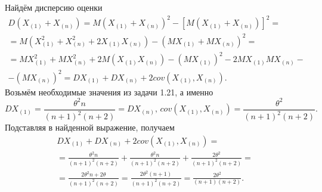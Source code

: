 \begin{enumerate}[label=\alph*)]
  Найдём дисперсию оценки
  \begin{equation*}
    \begin{split}
      D \left( X_{ \left( 1 \right) } + X_{ \left( n \right) } \right) =
      M \left( X_{ \left( 1 \right) } + X_{ \left( n \right) } \right)^2 -
      \left[ M \left(  X_{ \left( 1 \right) } + X_{ \left( n \right) } \right) \right]^2 = \\
      = M \left(
        X_{ \left( 1 \right) }^2 +
        X_{ \left( n \right) }^2 +
        2X_{ \left( 1 \right) } X_{ \left( n \right) }
      \right) -
      \left( MX_{ \left( 1 \right) } + MX_{ \left( n \right) } \right)^2 = \\
      = MX_{ \left( 1 \right) }^2 +
      MX_{ \left( n \right) }^2 +
      2M \left( X_{ \left( 1 \right) } X_{ \left( n \right) } \right) -
      \left( MX_{ \left( 1 \right) } \right)^2 -
      2MX_{ \left( 1 \right) } MX_{ \left( n \right) } - \\
      - \left( MX_{ \left( n \right) } \right)^2 =
      DX_{ \left( 1 \right) } +
      DX_{ \left( n \right) } +
      2cov \left( X_{ \left( 1 \right) }, X_{ \left( n \right) } \right).
    \end{split}
  \end{equation*}
  Возьмём необходимые значения из задачи 1.21, а именно
  $$DX_{ \left( 1 \right) } =
    \frac{ \theta^2 n}{ \left( n + 1 \right)^2 \left( n + 2 \right) } =
    DX_{ \left( n \right) }, \,
    cov \left( X_{ \left( 1 \right) }, X_{ \left( n \right) } \right) =
    \frac{ \theta^2}{ \left( n + 1 \right)^2 \left( n + 2 \right) }.$$
  Подставляя в найденной выражение, получаем
  \begin{equation*}
    \begin{split}
      DX_{ \left( 1 \right) } +
      DX_{ \left( n \right) } +
      2cov \left( X_{ \left( 1 \right) }, X_{ \left( n \right) } \right) = \\
      = \frac{ \theta^2 n}{ \left( n + 1 \right)^2 \left( n + 2 \right) } +
      \frac{ \theta^2 n}{ \left( n + 1 \right)^2 \left( n + 2 \right) } +
      \frac{2 \theta^2}{ \left( n + 1 \right)^2 \left( n + 2 \right) } = \\
      = \frac{2 \theta^2 n + 2 \theta }{ \left( n + 1 \right)^2 \left( n + 2 \right) } =
      \frac{2 \theta^2 \left( n + 1 \right) }{ \left( n + 1 \right)^2 \left( n + 2 \right) } =
      \frac{2 \theta^2}{ \left( n + 1 \right) \left( n + 2 \right) }.
    \end{split}
  \end{equation*}


\end{enumerate}
